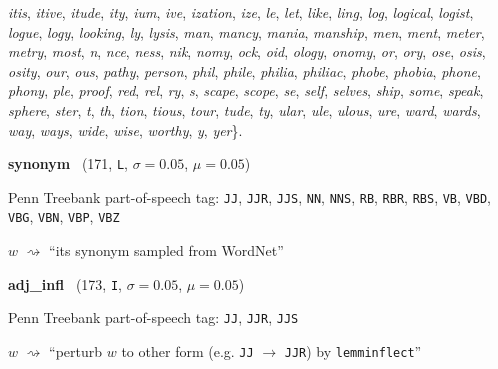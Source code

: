 \documentclass[11pt]{article}
\newenvironment{desc}{%
	\list{}{%
		\parsep 0.25em
		\topsep 0.25em
		\leftmargin 1em
		\rightmargin 0em
	}
	\item\relax
	\sloppy
}{%
	\endlist
}
\newcommand{\attr}[4]{%
	(#1, \texttt{#2}, $\sigma=#3$, $\mu=#4$)
}
\begin{document}
\begin{desc}
		\textit{itis},
		\textit{itive},
		\textit{itude},
		\textit{ity},
		\textit{ium},
		\textit{ive},
		\textit{ization},
		\textit{ize},
		\textit{le},
		\textit{let},
		\textit{like},
		\textit{ling},
		\textit{log},
		\textit{logical},
		\textit{logist},
		\textit{logue},
		\textit{logy},
		\textit{looking},
		\textit{ly},
		\textit{lysis},
		\textit{man},
		\textit{mancy},
		\textit{mania},
		\textit{manship},
		\textit{men},
		\textit{ment},
		\textit{meter},
		\textit{metry},
		\textit{most},
		\textit{n},
		\textit{nce},
		\textit{ness},
		\textit{nik},
		\textit{nomy},
		\textit{ock},
		\textit{oid},
		\textit{ology},
		\textit{onomy},
		\textit{or},
		\textit{ory},
		\textit{ose},
		\textit{osis},
		\textit{osity},
		\textit{our},
		\textit{ous},
		\textit{pathy},
		\textit{person},
		\textit{phil},
		\textit{phile},
		\textit{philia},
		\textit{philiac},
		\textit{phobe},
		\textit{phobia},
		\textit{phone},
		\textit{phony},
		\textit{ple},
		\textit{proof},
		\textit{red},
		\textit{rel},
		\textit{ry},
		\textit{s},
		\textit{scape},
		\textit{scope},
		\textit{se},
		\textit{self},
		\textit{selves},
		\textit{ship},
		\textit{some},
		\textit{speak},
		\textit{sphere},
		\textit{ster},
		\textit{t},
		\textit{th},
		\textit{tion},
		\textit{tious},
		\textit{tour},
		\textit{tude},
		\textit{ty},
		\textit{ular},
		\textit{ule},
		\textit{ulous},
		\textit{ure},
		\textit{ward},
		\textit{wards},
		\textit{way},
		\textit{ways},
		\textit{wide},
		\textit{wise},
		\textit{worthy},
		\textit{y},
		\textit{yer}\}.
\end{desc}

\noindent
\textbf{synonym}~\attr{171}{L}{0.05}{0.05}

\begin{desc}
	Penn Treebank part-of-speech tag:
	\texttt{JJ},
	\texttt{JJR},
	\texttt{JJS},
	\texttt{NN},
	\texttt{NNS},
	\texttt{RB},
	\texttt{RBR},
	\texttt{RBS},
	\texttt{VB},
	\texttt{VBD},
	\texttt{VBG},
	\texttt{VBN},
	\texttt{VBP},
	\texttt{VBZ}

	$w$ $\rightsquigarrow$ ``its synonym sampled from WordNet''
\end{desc}

\noindent
\textbf{adj\_infl}~\attr{173}{I}{0.05}{0.05}

\begin{desc}
	Penn Treebank part-of-speech tag:
	\texttt{JJ},
	\texttt{JJR},
	\texttt{JJS}

	$w$ $\rightsquigarrow$ ``perturb $w$ to other form (e.g. \texttt{JJ} $\to$ \texttt{JJR}) by \texttt{lemminflect}''
\end{desc}
\end{document}
